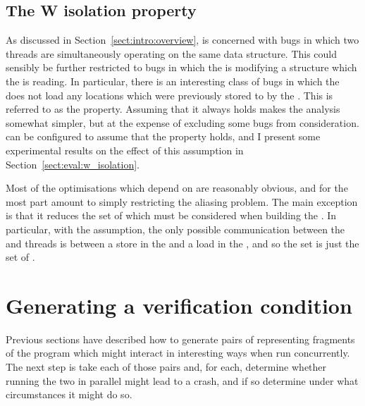\subsection{The W isolation property}

\label{sect:derive:w_isolation}


As discussed in Section~\ref{sect:intro:overview}, {\technique} is
concerned with bugs in which two threads are simultaneously operating
on the same data structure.  This could sensibly be further restricted
to bugs in which the  is modifying a
structure which the  is reading.  In
particular, there is an interesting class of bugs in which the
 does not load any locations which were
previously stored to by the .  This is
referred to as the  property.  Assuming that
it always holds makes the analysis somewhat simpler, but at the
expense of excluding some bugs from consideration.  {\Implementation}
can be configured to assume that the property holds, and I present
some experimental results on the effect of this assumption in
Section~\ref{sect:eval:w_isolation}.

Most of the optimisations which depend on  are
reasonably obvious, and for the most part amount to simply restricting
the aliasing problem.  The main exception is that it reduces the set
of  which must be considered when
building the  .  In
particular, with the  assumption, the only
possible communication between the  and
 threads is between a store in the
 and a load in the , and so the  set is
just the set of .

\section{Generating a verification condition}
\label{sect:using:check_realness}

Previous sections have described how to generate pairs of
{\StateMachines} representing fragments of the program which might
interact in interesting ways when run concurrently.  The next step is
take each of those pairs and, for each, determine whether running the
two {\StateMachines} in parallel might lead to a crash, and if so
determine under what circumstances it might do so.

